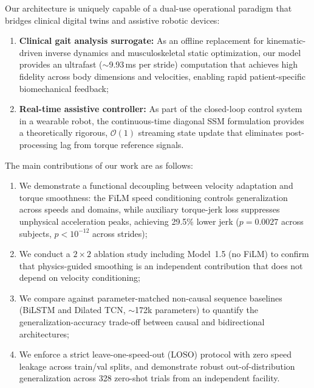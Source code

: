 \documentclass[fleqn,10pt]{wlscirep}
\begin{document}
Our architecture is uniquely capable of a dual-use operational paradigm that bridges clinical digital twins and assistive robotic devices\cite{chakshu2024digital, sun2023digital}:
\begin{enumerate}
\item \textbf{Clinical gait analysis surrogate:} As an offline replacement for kinematic-driven inverse dynamics and musculoskeletal static optimization, our model provides an ultrafast ($\sim$9.93\,ms per stride) computation that achieves high fidelity across body dimensions and velocities, enabling rapid patient-specific biomechanical feedback;
\item \textbf{Real-time assistive controller:} As part of the closed-loop control system in a wearable robot, the continuous-time diagonal SSM formulation provides a theoretically rigorous, $\mathcal{O}(1)$ streaming state update that eliminates post-processing lag from torque reference signals.
\end{enumerate}

The main contributions of our work are as follows:
\begin{enumerate}
\item We demonstrate a functional decoupling between velocity adaptation and torque smoothness: the FiLM speed conditioning controls generalization across speeds and domains, while auxiliary torque-jerk loss suppresses unphysical acceleration peaks, achieving 29.5\% lower jerk ($p = 0.0027$ across subjects, $p < 10^{-12}$ across strides);
\item We conduct a $2 \times 2$ ablation study including Model~1.5 (no FiLM) to confirm that physics-guided smoothing is an independent contribution that does not depend on velocity conditioning;
\item We compare against parameter-matched non-causal sequence baselines (BiLSTM and Dilated TCN, $\sim$172k parameters) to quantify the generalization-accuracy trade-off between causal and bidirectional architectures;
\item We enforce a strict leave-one-speed-out (LOSO) protocol with zero speed leakage across train/val splits, and demonstrate robust out-of-distribution generalization across 328 zero-shot trials from an independent facility.
\end{enumerate}
\end{document}
